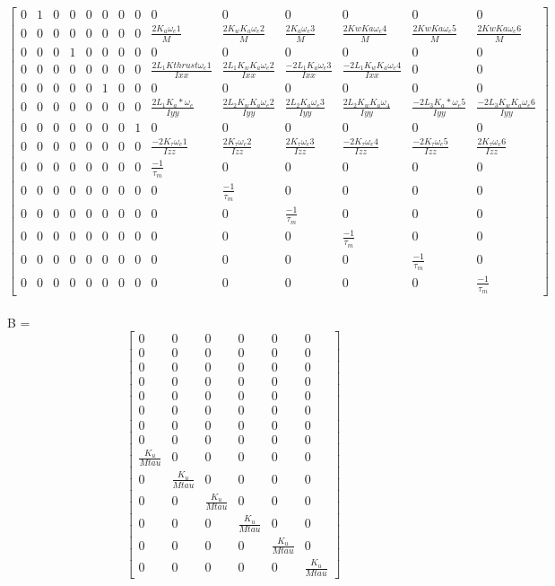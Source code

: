 \documentclass[12pt,a4paper,twoside]{report}
\begin{document}
					$$
					\begin{bmatrix}
						0&1&0&0&0&0&0&0&0&0&0&0&0&0\\
						0&0&0&0&0&0&0&0&\frac{2K_a\omega_e1}{M}&\frac{2K_wK_a\omega_e2}{M}&\frac{2K_a\omega_e3}{M}&\frac{2KwKa\omega_e4}{M}&\frac{2KwKa\omega_e5}{M}&\frac{2KwKa\omega_e6}{M}\\
						0&0&0&1&0&0&0&0&0&0&0&0&0&0\\
						0&0&0&0&0&0&0&0&\frac{2L_1Kthrust\omega_e1}{Ixx}&\frac{2L_1K_wK_a\omega_e2}{Ixx}& \frac{-2L_1K_a\omega_e3}{Ixx}&\frac{-2L_1K_wK_a\omega_e4}{Ixx}&0&0\\
						0&0&0&0&0&1&0&0&0&0&0&0&0&0\\
						0&0&0&0&0&0&0&0&\frac{2L_1K_a*\omega_e}{Iyy}&\frac{2L_2K_wK_a\omega_e2}{Iyy}& \frac{2L_2K_a\omega_e3}{Iyy}&\frac{2L_2K_wK_a\omega_4}{Iyy}&\frac{-2L_3K_a*\omega_e5}{Iyy}&\frac{-2L_3K_wK_a\omega_e6}{Iyy}\\
						0&0&0&0&0&0&0&1&0&0&0&0&0&0\\
						0&0&0&0&0&0&0&0&\frac{-2K_\tau\omega_e1}{Izz}&\frac{2K_\tau\omega_e2}{Izz}&\frac{2K_\tau\omega_e3}{Izz}&\frac{-2K_\tau\omega_e4}{Izz}&\frac{-2K_\tau\omega_e5}{Izz}&\frac{2K_\tau\omega_e6}{Izz}\\
						0&0&0&0&0&0&0&0&\frac{-1}{\tau_m}&0&0&0&0&0\\
						0&0&0&0&0&0&0&0&0&\frac{-1}{\tau_m}&0&0&0&0\\
						0&0&0&0&0&0&0&0&0&0&\frac{-1}{\tau_m}&0&0&0\\
						0&0&0&0&0&0&0&0&0&0&0&\frac{-1}{\tau_m}&0&0\\
						0&0&0&0&0&0&0&0&0&0&0&0&\frac{-1}{\tau_m}&0\\
						0&0&0&0&0&0&0&0&0&0&0&0&0&\frac{-1}{\tau_m}
					\end{bmatrix}
					$$
					\\
					B = 
					$$
					\begin{bmatrix}
					0&0&0&0&0&0\\
					0&0&0&0&0&0\\
					0&0&0&0&0&0\\
					0&0&0&0&0&0\\
					0&0&0&0&0&0\\
					0&0&0&0&0&0\\
					0&0&0&0&0&0\\
					0&0&0&0&0&0\\
					\frac{K_u}{Mtau}&0&0&0&0&0\\
					0&\frac{K_u}{Mtau}&0&0&0&0\\
					0&0&\frac{K_u}{Mtau}&0&0&0\\
					0&0&0&\frac{K_u}{Mtau}&0&0\\
					0&0&0&0&\frac{K_u}{Mtau}&0\\
					0&0&0&0&0&\frac{K_u}{Mtau}
					\end{bmatrix}
					$$
			\newpage
			
\end{document}
